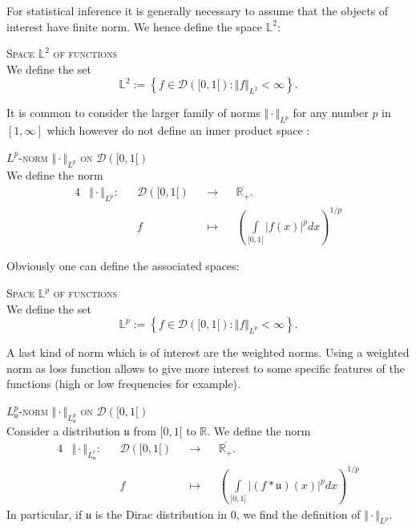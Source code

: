 For statistical inference it is generally necessary to assume that the objects of interest have finite norm.
We hence define the space $\mathds{L}^{2}$:
\begin{de}{\textsc{Space $\mathds{L}^{2}$ of functions}\\}\label{de1.4.6}
We define the set
\[\mathds{L}^{2} := \left\{f \in \mathcal{D}([0, 1[) : \Vert f \Vert_{L^{2}} < \infty \right\}.\]
\end{de}

It is common to consider the larger family of norms $\Vert \cdot \Vert_{L^{p}}$ for any number $p$ in $[1, \infty]$ which however do not define an inner product space :
\begin{de}{\textsc{$L^{p}$-norm $\Vert \cdot \Vert_{L^{p}}$ on $\mathcal{D}([0,1[)$}\\}\label{de1.4.7}
We define the norm
\begin{alignat*}{4}
& \Vert \cdot \Vert_{L^{p}} : && \mathcal{D}([0,1[) && \rightarrow && \overline{\mathds{R}_{+}}.\\
& && f && \mapsto && \left(\int\limits_{[0, 1[} \vert f(x)\vert^{p} dx\right)^{1/p}
\end{alignat*}
\end{de}

Obviously one can define the associated spaces:
\begin{de}{\textsc{Space $\mathds{L}^{p}$ of functions}\\}\label{de1.4.8}
We define the set
\[\mathds{L}^{p} := \left\{f \in \mathcal{D}([0, 1[) : \Vert f \Vert_{L^{p}} < \infty \right\}.\]
\end{de}

A last kind of norm which is of interest are the weighted norms.
Using a weighted norm as loss function allows to give more interest to some specific features of the functions (high or low frequencies for example).
\begin{de}{\textsc{$L^{p}_{\mathfrak{u}}$-norm $\Vert \cdot \Vert_{L^{p}_{\mathfrak{u}}}$ on $\mathcal{D}([0,1[)$}\\}\label{de1.4.9}
Consider a distribution $\mathfrak{u}$ from $[0,1[$ to $\mathds{R}$.
We define the norm
\begin{alignat*}{4}
& \Vert \cdot \Vert_{L^{r}_{\mathfrak{u}}} : && \mathcal{D}([0,1[) && \rightarrow && \overline{\mathds{R}_{+}}.\\
& && f && \mapsto && \left(\int\limits_{[0, 1[} \vert (f*\mathfrak{u})(x)\vert^{p} dx\right)^{1/p}
\end{alignat*}
In particular, if $\mathfrak{u}$ is the Dirac distribution in $0$, we find the definition of $\Vert \cdot \Vert_{L^{p}}$.
\end{de}

